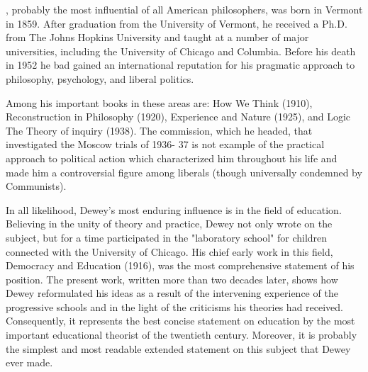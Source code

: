 , probably the most influential of all American philosophers, was born 
in Vermont in 1859. After graduation from the University of Vermont, he received a 
Ph.D. from The Johns Hopkins University and taught at a number of major universities, 
including the University of Chicago and Columbia. Before his death in 1952 he bad 
gained an international reputation for his pragmatic approach to philosophy, psychology, 
and liberal politics. 

Among his important books in these areas are: How We Think (1910), Reconstruction 
in Philosophy (1920), Experience and Nature (1925), and Logic The Theory of inquiry 
(1938). The commission, which he headed, that investigated the Moscow trials of 1936- 
37 is not example of the practical approach to political action which characterized him 
throughout his life and made him a controversial figure among liberals (though 
universally condemned by Communists). 

In all likelihood, Dewey's most enduring influence is in the field of education. 
Believing in the unity of theory and practice, Dewey not only wrote on the subject, but 
for a time participated in the "laboratory school" for children connected with the 
University of Chicago. His chief early work in this field, Democracy and Education 
(1916), was the most comprehensive statement of his position. The present work, written 
more than two decades later, shows how Dewey reformulated his ideas as a result of the 
intervening experience of the progressive schools and in the light of the criticisms his 
theories had received. Consequently, it represents the best concise statement on education 
by the most important educational theorist of the twentieth century. Moreover, it is 
probably the simplest and most readable extended statement on this subject that Dewey 
ever made. 
